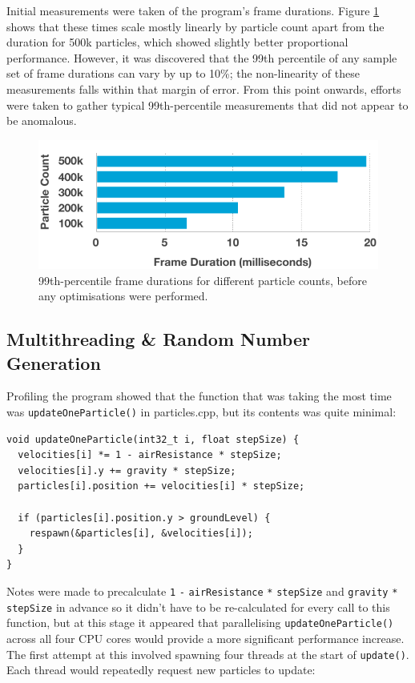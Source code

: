 \documentclass[11pt, a4paper, twocolumn]{article}
\begin{document}
Initial measurements were taken of the program's frame durations. Figure \ref{fig:initialtimes} shows that these times scale mostly linearly by particle count apart from the duration for 500k particles, which showed slightly better proportional performance. However, it was discovered that the 99th percentile of any sample set of frame durations can vary by up to 10\%; the non-linearity of these measurements falls within that margin of error. From this point onwards, efforts were taken to gather typical 99th-percentile measurements that did not appear to be anomalous.

\begin{figure}[h]
\includegraphics[width=\linewidth]{initialtimes}
\caption{99th-percentile frame durations for different particle counts, before any optimisations were performed.}
\label{fig:initialtimes}
\end{figure}

\subsection{Multithreading \& Random Number Generation}

Profiling the program showed that the function that was taking the most time was \verb|updateOneParticle()| in particles.cpp, but its contents was quite minimal:

\begin{verbatim}
void updateOneParticle(int32_t i, float stepSize) {
  velocities[i] *= 1 - airResistance * stepSize;
  velocities[i].y += gravity * stepSize;
  particles[i].position += velocities[i] * stepSize;

  if (particles[i].position.y > groundLevel) {
    respawn(&particles[i], &velocities[i]);
  }
}
\end{verbatim}

Notes were made to precalculate \verb|1| \verb|-| \verb|airResistance| \verb|*| \verb|stepSize| and \verb|gravity| \verb|*| \verb|stepSize| in advance so it didn't have to be re-calculated for every call to this function, but at this stage it appeared that parallelising \verb|updateOneParticle()| across all four CPU cores would provide a more significant performance increase. The first attempt at this involved spawning four threads at the start of \verb|update()|. Each thread would repeatedly request new particles to update:
\end{document}
